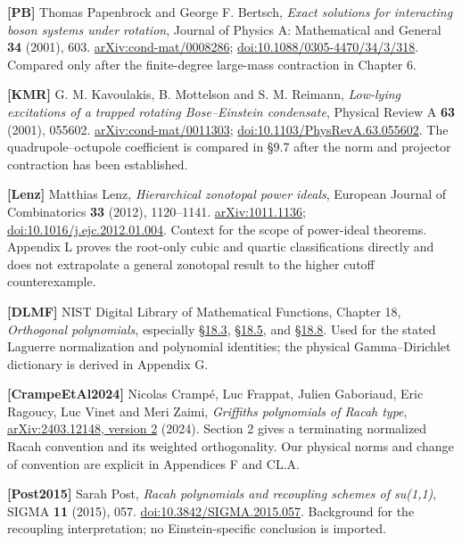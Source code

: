 \documentclass[a4paper,11pt]{article}
\numberwithin{equation}{section}
\begin{document}
\textbf{{[}PB{]}} Thomas Papenbrock and George F. Bertsch, \emph{Exact solutions for interacting boson systems under rotation}, Journal of Physics A: Mathematical and General \textbf{34} (2001), 603. \href{https://arxiv.org/abs/cond-mat/0008286}{arXiv:cond-mat/0008286}; \href{https://doi.org/10.1088/0305-4470/34/3/318}{doi:10.1088/0305-4470/34/3/318}. Compared only after the finite-degree large-mass contraction in Chapter 6.

\textbf{{[}KMR{]}} G. M. Kavoulakis, B. Mottelson and S. M. Reimann, \emph{Low-lying excitations of a trapped rotating Bose--Einstein condensate}, Physical Review A \textbf{63} (2001), 055602. \href{https://arxiv.org/abs/cond-mat/0011303}{arXiv:cond-mat/0011303}; \href{https://doi.org/10.1103/PhysRevA.63.055602}{doi:10.1103/PhysRevA.63.055602}. The quadrupole--octupole coefficient is compared in §9.7 after the norm and projector contraction has been established.

\textbf{{[}Lenz{]}} Matthias Lenz, \emph{Hierarchical zonotopal power ideals}, European Journal of Combinatorics \textbf{33} (2012), 1120--1141. \href{https://arxiv.org/abs/1011.1136}{arXiv:1011.1136}; \href{https://doi.org/10.1016/j.ejc.2012.01.004}{doi:10.1016/j.ejc.2012.01.004}. Context for the scope of power-ideal theorems. Appendix L proves the root-only cubic and quartic classifications directly and does not extrapolate a general zonotopal result to the higher cutoff counterexample.

\textbf{{[}DLMF{]}} NIST Digital Library of Mathematical Functions, Chapter 18, \emph{Orthogonal polynomials}, especially \href{https://dlmf.nist.gov/18.3}{§18.3}, \href{https://dlmf.nist.gov/18.5}{§18.5}, and \href{https://dlmf.nist.gov/18.8}{§18.8}. Used for the stated Laguerre normalization and polynomial identities; the physical Gamma--Dirichlet dictionary is derived in Appendix G.

\textbf{{[}CrampeEtAl2024{]}} Nicolas Crampé, Luc Frappat, Julien Gaboriaud, Eric Ragoucy, Luc Vinet and Meri Zaimi, \emph{Griffiths polynomials of Racah type}, \href{https://arxiv.org/html/2403.12148v2}{arXiv:2403.12148, version 2} (2024). Section 2 gives a terminating normalized Racah convention and its weighted orthogonality. Our physical norms and change of convention are explicit in Appendices F and CL.A.

\textbf{{[}Post2015{]}} Sarah Post, \emph{Racah polynomials and recoupling schemes of su(1,1)}, SIGMA \textbf{11} (2015), 057. \href{https://doi.org/10.3842/SIGMA.2015.057}{doi:10.3842/SIGMA.2015.057}. Background for the recoupling interpretation; no Einstein-specific conclusion is imported.
\end{document}
